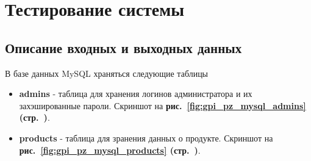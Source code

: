 \newpage

\section{Тестирование системы}




\subsection{Описание входных и выходных данных}

В базе данных MySQL храняться следующие таблицы

\begin{itemize}
    \item \textbf{admins} - таблица для хранения логинов администратора и их захэшированные пароли.
    Скриншот на \textbf{рис.~\ref{fig:gpi_pz_mysql_admins} (стр.~\pageref{fig:gpi_pz_mysql_admins})}.
    \item \textbf{products} - таблица для зранения данных о продукте.
    Скриншот на \textbf{рис.~\ref{fig:gpi_pz_mysql_products} (стр.~\pageref{fig:gpi_pz_mysql_products})}.
\end{itemize}

